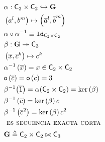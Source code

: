 \documentclass[12pt,a4paper,fleqn,spanish,final,openright]{extbook}
\theoremstyle{definition}
\theoremstyle{remark}
\begin{document}
\begin{align*}
&{\alpha } : {\mathsf{C}}_{2} \times {\mathsf{C}}_{2}  \hookrightarrow  \mathbf{G}\\
&			\left(a^l,b^m\right)  \mapsto \left(\overline{a}^l,\overline{b}^{m}\right)\\
& {\alpha } \circ {{\alpha }^{-1}}
 \equiv
{\mathtt{Id}}_{{{\mathsf{C}}_{2}} \times {{\mathsf{C}}_{2}}}\\
&\beta : \mathbf{G} \twoheadrightarrow {\mathsf{C}}_{3}\\
&			\left(\overline{x},\overline{c}^k\right)  \mapsto c^k\\
& {\alpha }^{-1}\left(\overline{x}\right)=x \in \mathsf{C}_{2} \times \mathsf{C}_{2}\\
& \mathsf{o}\left(\overline{c}\right)=\mathsf{o}\left(c\right)=3\\
& {{\beta }^{-1}}{\left(\overline{1}\right)}=
{\alpha }{\left({{\mathsf{C}}_{2} \times {\mathsf{C}}_{2}}\right)}=
\ker\left({\beta }\right)\\
& {\beta }^{-1}\left(\overline{c}\right)=\ker\left(\beta \right) c\\
& {\beta }^{-1}\left(\overline{c}^2\right)=\ker\left(\beta \right) c^2\\
& \mbox{\textsc{ es secuencia exacta corta }}\\
& {\mathbf{G}}\triangleq {\mathsf{C}_{2} \times \mathsf{C}_{2}}\bowtie{\mathsf{C}_{3}}
\end{align*}
\end{document}
